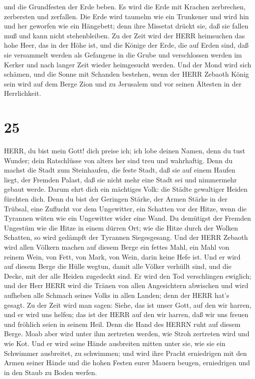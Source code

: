 und die Grundfesten der Erde beben.  Es wird die Erde mit
Krachen zerbrechen, zerbersten und zerfallen.  Die Erde
wird taumelm wie ein Trunkener und wird hin und her geworfen wie ein
Hängebett; denn ihre Missetat drückt sie, daß sie fallen muß und kann
nicht stehenbleiben.  Zu der Zeit wird der HERR heimsuchen
das hohe Heer, das in der Höhe ist, und die Könige der Erde, die auf
Erden sind,  daß sie versammelt werden als Gefangene in die
Grube und verschlossen werden im Kerker und nach langer Zeit wieder
heimgesucht werden.  Und der Mond wird sich schämen, und
die Sonne mit Schanden bestehen, wenn der HERR Zebaoth König sein wird
auf dem Berge Zion und zu Jerusalem und vor seinen Ältesten in der
Herrlichkeit.

\hypertarget{section-24}{%
\section{25}\label{section-24}}

 HERR, du bist mein Gott! dich preise ich; ich lobe deinen
Namen, denn du tust Wunder; dein Ratschlüsse von alters her sind treu
und wahrhaftig.  Denn du machst die Stadt zum Steinhaufen,
die feste Stadt, daß sie auf einem Haufen liegt, der Fremden Palast, daß
sie nicht mehr eine Stadt sei und nimmermehr gebaut werde. 
Darum ehrt dich ein mächtiges Volk: die Städte gewaltiger Heiden
fürchten dich.  Denn du bist der Geringen Stärke, der Armen
Stärke in der Trübsal, eine Zuflucht vor dem Ungewitter, ein Schatten
vor der Hitze, wenn die Tyrannen wüten wie ein Ungewitter wider eine
Wand.  Du demütigst der Fremden Ungestüm wie die Hitze in
einem dürren Ort; wie die Hitze durch der Wolken Schatten, so wird
gedämpft der Tyrannen Siegesgesang.  Und der HERR Zebaoth
wird allen Völkern machen auf diesem Berge ein fettes Mahl, ein Mahl von
reinem Wein, von Fett, von Mark, von Wein, darin keine Hefe ist.
 Und er wird auf diesem Berge die Hülle wegtun, damit alle
Völker verhüllt sind, und die Decke, mit der alle Heiden zugedeckt sind.
 Er wird den Tod verschlingen ewiglich; und der Herr HERR
wird die Tränen von allen Angesichtern abwischen und wird aufheben alle
Schmach seines Volks in allen Landen; denn der HERR hat's gesagt.
 Zu der Zeit wird man sagen: Siehe, das ist unser Gott, auf
den wir harren, und er wird uns helfen; das ist der HERR auf den wir
harren, daß wir uns freuen und fröhlich seien in seinem Heil.
 Denn die Hand des HERRN ruht auf diesem Berge. Moab aber
wird unter ihm zertreten werden, wie Stroh zertreten wird und wie Kot.
 Und er wird seine Hände ausbreiten mitten unter sie, wie
sie ein Schwimmer ausbreitet, zu schwimmen; und wird ihre Pracht
erniedrigen mit den Armen seiner Hände  und die hohen
Festen eurer Mauern beugen, erniedrigen und in den Staub zu Boden
werfen.

